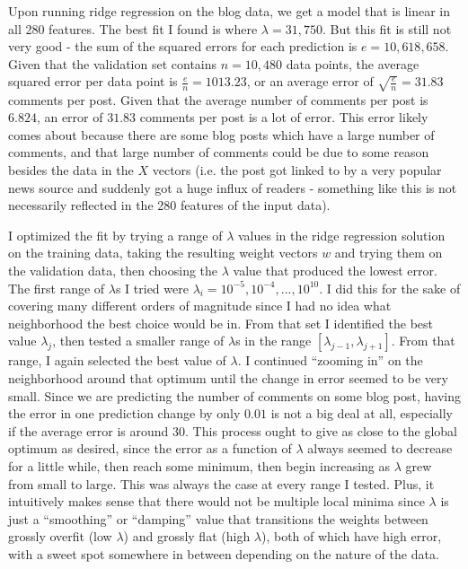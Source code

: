 \documentclass{paper}
\begin{document}
Upon running ridge regression on the blog data, we get a model that is linear in all 280 features. The best fit I found is where $\lambda = 31,750$. But this fit is still not very good - the sum of the squared errors for each prediction is $e = 10,618,658$. Given that the validation set contains $n=10,480$ data points, the average squared error per data point is $\frac{e}{n} = 1013.23$, or an average error of $\sqrt{\frac{e}{n}} = 31.83$ comments per post. Given that the average number of comments per post is $6.824$, an error of $31.83$ comments per post is a lot of error. This error likely comes about because there are some blog posts which have a large number of comments, and that large number of comments could be due to some reason besides the data in the $X$ vectors (i.e. the post got linked to by a very popular news source and suddenly got a huge influx of readers - something like this is not necessarily reflected in the 280 features of the input data). 

I optimized the fit by trying a range of $\lambda$ values in the ridge regression solution on the training data, taking the resulting weight vectors $w$ and trying them on the validation data, then choosing the $\lambda$ value that produced the lowest error. The first range of $\lambda$s I tried were $\lambda_i = 10^{-5}, 10^{-4}, ..., 10^{10}$. I did this for the sake of covering many different orders of magnitude since I had no idea what neighborhood the best choice would be in. From that set I identified the best value $\lambda_j$, then tested a smaller range of $\lambda$s in the range $[\lambda_{j-1}, \lambda_{j+1}]$. From that range, I again selected the best value of $\lambda$. I continued ``zooming in'' on the neighborhood around that optimum until the change in error seemed to be very small. Since we are predicting the number of comments on some blog post, having the error in one prediction change by only $0.01$ is not a big deal at all, especially if the average error is around $30$. This process ought to give as close to the global optimum as desired, since the error as a function of $\lambda$ always seemed to decrease for a little while, then reach some minimum, then begin increasing as $\lambda$ grew from small to large. This was always the case at every range I tested. Plus, it intuitively makes sense that there would not be multiple local minima since $\lambda$ is just a ``smoothing'' or ``damping'' value that transitions the weights between grossly overfit (low $\lambda$) and grossly flat (high $\lambda$), both of which have high error, with a sweet spot somewhere in between depending on the nature of the data.
\end{document}
